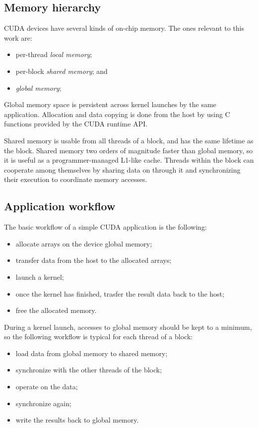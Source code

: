 \subsection{Memory hierarchy}
\label{sub:memory-hierarchy}

CUDA devices have several kinds of on-chip memory.
The ones relevant to this work are:
\begin{itemize}
  \item per-thread \emph{local memory};
  \item per-block \emph{shared memory}; and
  \item \emph{global memory};
\end{itemize}

Global memory space is persistent across kernel launches
by the same application.
Allocation and data copying is done from the host
by using C functions provided by the CUDA runtime API.

Shared memory is usable from all threads of a block,
and has the same lifetime as the block.
Shared memory two orders of magnitude faster than global memory,
so it is useful as a programmer-managed L1-like cache.
Threads within the block can cooperate among themselves
by sharing data on through it and synchronizing their execution
to coordinate memory accesses.

\subsection{Application workflow}
\label{sub:app-workflow}

The basic workflow of a simple CUDA application is the following:
\begin{itemize}
  \item allocate arrays on the device global memory;
  \item transfer data from the host to the allocated arrays;
  \item launch a kernel;
  \item once the kernel has finished,
    trasfer the result data back to the host;
  \item free the allocated memory.
\end{itemize}

During a kernel launch,
accesses to global memory should be kept to a minimum,
so the following workflow is typical for each thread of a block:
\begin{itemize}
  \item load data from global memory to shared memory;
  \item synchronize with the other threads of the block;
  \item operate on the data;
  \item synchronize again;
  \item write the results back to global memory.
\end{itemize}

